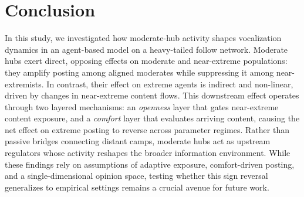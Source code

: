 \documentclass{svproc}
\def\Black{\color[rgb]{0,0,0}}
\begin{document}
\section{Conclusion}\label{sec:conclusion}
In this study, we investigated how moderate-hub activity shapes
vocalization dynamics in an agent-based model on a heavy-tailed follow
network. Moderate hubs exert direct, opposing effects on moderate and
near-extreme populations: they amplify posting among aligned moderates
while suppressing it among near-extremists. In contrast, their effect
on extreme agents is indirect and non-linear, driven by changes in
near-extreme content flows. This downstream effect operates through
two layered mechanisms: an \emph{openness} layer that gates
near-extreme content exposure, and a \emph{comfort} layer that
evaluates arriving content, causing the net effect on extreme posting
to reverse across parameter regimes. Rather than passive bridges
connecting distant camps, moderate hubs act as upstream regulators
whose activity reshapes the broader information environment. While
these findings rely on assumptions of adaptive exposure,
comfort-driven posting, and a single-dimensional opinion space,
testing whether this sign reversal generalizes to empirical settings
remains a crucial avenue for future work.

%
\Black%
%



\end{document}

